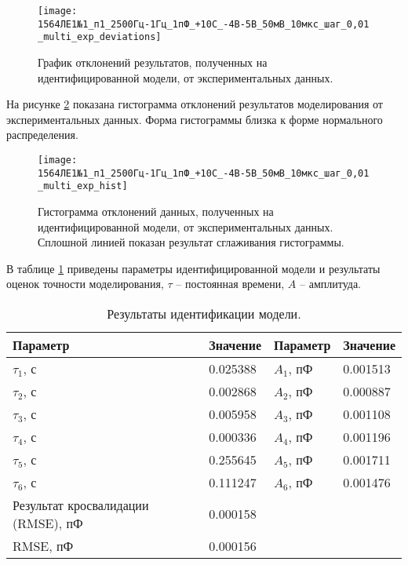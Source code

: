 	\begin{figure}[!htp]
		\centering
		\texttt{[image: 1564ЛЕ1№1\_п1\_2500Гц-1Гц\_1пФ\_+10С\_-4В-5В\_50мВ\_10мкс\_шаг\_0,01\_multi\_exp\_deviations]}
		\caption{График отклонений результатов, полученных на идентифицированной
		модели, от экспериментальных данных.}
		\label{pic:multi_exp_deviations_283}
	\end{figure}

	На рисунке \ref{pic:multi_exp_hist_283} показана гистограмма отклонений 
	результатов моделирования от экспериментальных данных. Форма гистограммы 
	близка к форме нормального распределения.

	\begin{figure}[!htp]
		\centering
		\texttt{[image: 1564ЛЕ1№1\_п1\_2500Гц-1Гц\_1пФ\_+10С\_-4В-5В\_50мВ\_10мкс\_шаг\_0,01\_multi\_exp\_hist]}
		\caption{Гистограмма отклонений данных, полученных на идентифицированной 
		         модели, от экспериментальных данных. Сплошной линией показан
		         результат сглаживания гистограммы.}
		\label{pic:multi_exp_hist_283}
	\end{figure}

	В таблице \ref{table:multi_exp_results_283} приведены параметры 
	идентифицированной модели и результаты оценок точности моделирования,  
	$\tau$ -- постоянная времени, $A$ -- амплитуда.

	\begin{table}[!htp]
		\centering
		\caption{Результаты идентификации модели.}
		\begin{tabular}{|l|l|l|l|}
			\hline
			Параметр                           & Значение & Параметр  & Значение  \\ \hline
			$\tau_1$, с                        & 0.025388 & $A_1$, пФ & 0.001513  \\ \hline
			$\tau_2$, с                        & 0.002868 & $A_2$, пФ & 0.000887  \\ \hline
			$\tau_3$, с                        & 0.005958 & $A_3$, пФ & 0.001108  \\ \hline
			$\tau_4$, с                        & 0.000336 & $A_4$, пФ & 0.001196  \\ \hline
			$\tau_5$, с                        & 0.255645 & $A_5$, пФ & 0.001711  \\ \hline
			$\tau_6$, с                        & 0.111247 & $A_6$, пФ & 0.001476  \\ \hline
			Результат кросвалидации (RMSE), пФ & 0.000158 &           &           \\ \hline
			RMSE, пФ                           & 0.000156 &           &           \\ \hline
		\end{tabular}
		\label{table:multi_exp_results_283}
	\end{table}

